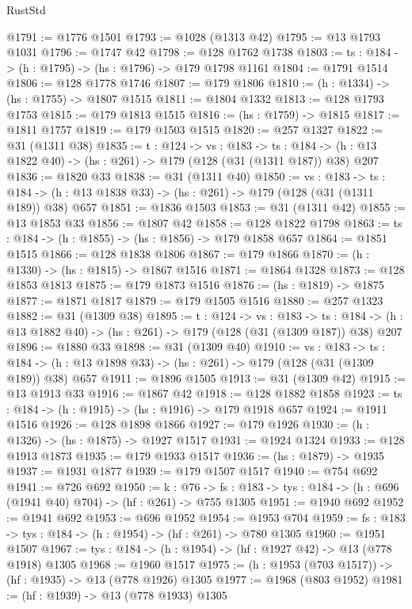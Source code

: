\begin{lexlean}{RustStd}
\begin{coremodule}
@1791 := @1776 @1501
@1793 := @1028 (@1313 @42)
@1795 := @13 @1793 @1031
@1796 := @1747 @42
@1798 := @128 @1762 @1738
@1803 := {ts : @184} -> (h : @1795) -> (hs : @1796) -> @179 @1798 @1161
@1804 := @1791 @1514
@1806 := @128 @1778 @1746
@1807 := @179 @1806
@1810 := (h : @1334) -> (hs : @1755) -> @1807 @1515
@1811 := @1804 @1332
@1813 := @128 @1793 @1753
@1815 := @179 @1813 @1515
@1816 := (hs : @1759) -> @1815
@1817 := @1811 @1757
@1819 := @179 @1503 @1515
@1820 := @257 @1327
@1822 := @31 (@1311 @38)
@1835 := {t : @124} ->
  {vs : @183} ->
  {ts : @184} -> (h : @13 @1822 @40) -> (hs : @261) -> @179 (@128 (@31 (@1311 @187)) @38) @207
@1836 := @1820 @33
@1838 := @31 (@1311 @40)
@1850 := {vs : @183} ->
  {ts : @184} -> (h : @13 @1838 @33) -> (hs : @261) -> @179 (@128 (@31 (@1311 @189)) @38) @657
@1851 := @1836 @1503
@1853 := @31 (@1311 @42)
@1855 := @13 @1853 @33
@1856 := @1807 @42
@1858 := @128 @1822 @1798
@1863 := {ts : @184} -> (h : @1855) -> (hs : @1856) -> @179 @1858 @657
@1864 := @1851 @1515
@1866 := @128 @1838 @1806
@1867 := @179 @1866
@1870 := (h : @1330) -> (hs : @1815) -> @1867 @1516
@1871 := @1864 @1328
@1873 := @128 @1853 @1813
@1875 := @179 @1873 @1516
@1876 := (hs : @1819) -> @1875
@1877 := @1871 @1817
@1879 := @179 @1505 @1516
@1880 := @257 @1323
@1882 := @31 (@1309 @38)
@1895 := {t : @124} ->
  {vs : @183} ->
  {ts : @184} -> (h : @13 @1882 @40) -> (hs : @261) -> @179 (@128 (@31 (@1309 @187)) @38) @207
@1896 := @1880 @33
@1898 := @31 (@1309 @40)
@1910 := {vs : @183} ->
  {ts : @184} -> (h : @13 @1898 @33) -> (hs : @261) -> @179 (@128 (@31 (@1309 @189)) @38) @657
@1911 := @1896 @1505
@1913 := @31 (@1309 @42)
@1915 := @13 @1913 @33
@1916 := @1867 @42
@1918 := @128 @1882 @1858
@1923 := {ts : @184} -> (h : @1915) -> (hs : @1916) -> @179 @1918 @657
@1924 := @1911 @1516
@1926 := @128 @1898 @1866
@1927 := @179 @1926
@1930 := (h : @1326) -> (hs : @1875) -> @1927 @1517
@1931 := @1924 @1324
@1933 := @128 @1913 @1873
@1935 := @179 @1933 @1517
@1936 := (hs : @1879) -> @1935
@1937 := @1931 @1877
@1939 := @179 @1507 @1517
@1940 := @754 @692
@1941 := @726 @692
@1950 := {k : @76} ->
  {fs : @183} -> {tys : @184} -> (h : @696 (@1941 @40) @704) -> (hf : @261) -> @755 @1305
@1951 := @1940 @692
@1952 := @1941 @692
@1953 := @696 @1952
@1954 := @1953 @704
@1959 := {fs : @183} -> {tys : @184} -> (h : @1954) -> (hf : @261) -> @780 @1305
@1960 := @1951 @1507
@1967 := {tys : @184} -> (h : @1954) -> (hf : @1927 @42) -> @13 (@778 @1918) @1305
@1968 := @1960 @1517
@1975 := (h : @1953 (@703 @1517)) -> (hf : @1935) -> @13 (@778 @1926) @1305
@1977 := @1968 (@803 @1952)
@1981 := (hf : @1939) -> @13 (@778 @1933) @1305

\end{coremodule}
\end{lexlean}
